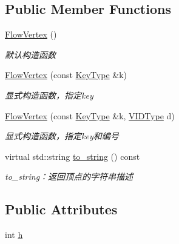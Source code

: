 \subsection*{Public Member Functions}
\begin{DoxyCompactItemize}
\item 
\hyperlink{struct_introduction_to_algorithm_1_1_graph_algorithm_1_1_flow_vertex_a19355adc725984f1ae28f254b6ba9bd7}{Flow\+Vertex} ()
\begin{DoxyCompactList}\small\item\em 默认构造函数 \end{DoxyCompactList}\item 
\hyperlink{struct_introduction_to_algorithm_1_1_graph_algorithm_1_1_flow_vertex_a4593a33cdfec0ecf40f9908d4fee5e00}{Flow\+Vertex} (const \hyperlink{struct_introduction_to_algorithm_1_1_graph_algorithm_1_1_flow_vertex_a014b25c20124a24525ef7db0588466b9}{Key\+Type} \&k)
\begin{DoxyCompactList}\small\item\em 显式构造函数，指定{\ttfamily key} \end{DoxyCompactList}\item 
\hyperlink{struct_introduction_to_algorithm_1_1_graph_algorithm_1_1_flow_vertex_a49bbf9ed3ed8769337403d455c383a4f}{Flow\+Vertex} (const \hyperlink{struct_introduction_to_algorithm_1_1_graph_algorithm_1_1_flow_vertex_a014b25c20124a24525ef7db0588466b9}{Key\+Type} \&k, \hyperlink{struct_introduction_to_algorithm_1_1_graph_algorithm_1_1_flow_vertex_ae48ab0918590bd6a6763d007694ff161}{V\+I\+D\+Type} d)
\begin{DoxyCompactList}\small\item\em 显式构造函数，指定{\ttfamily key}和编号 \end{DoxyCompactList}\item 
virtual std\+::string \hyperlink{struct_introduction_to_algorithm_1_1_graph_algorithm_1_1_flow_vertex_aa373a13a1fdee1fdcdbd0b55eaa1d1fb}{to\+\_\+string} () const 
\begin{DoxyCompactList}\small\item\em to\+\_\+string：返回顶点的字符串描述 \end{DoxyCompactList}\end{DoxyCompactItemize}
\subsection*{Public Attributes}
\begin{DoxyCompactItemize}
\item 
int \hyperlink{struct_introduction_to_algorithm_1_1_graph_algorithm_1_1_flow_vertex_a05f50003725449bbc9f4ee929c9ea87a}{h}
\end{DoxyCompactItemize}


